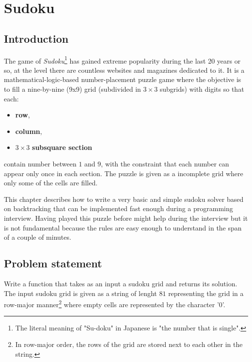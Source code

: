 %

\chapter{Sudoku}
\label{ch:sudoku}
\section*{Introduction}
The game of \textit{Sudoku}\footnote{The literal meaning of "Su-doku" in Japanese is "the number
that is single".} has gained extreme popularity during the last 20 years or so, at the level there
are countless websites and magazines dedicated to it. It is a mathematical-logic-based
number-placement puzzle game where the objective is to fill a nine-by-nine (9x9) grid (subdivided in
$3\times3$ subgrids) with digits so that each:
\begin{itemize}[]
	\item \textbf{row},
	\item \textbf{column},
	\item $3\times3$ \textbf{subsquare section}
\end{itemize}
contain number between $1$ and $9$, with the constraint that each number can appear only once in
each section. The puzzle is given as a incomplete grid where only some of the cells are filled.

This chapter describes how to write a very basic and simple sudoku solver based on backtracking that
can be implemented fast enough during a programming interview. Having played this puzzle before
might help during the interview but it is not fundamental because the rules are easy enough to
understand in the span of a couple of minutes.


\section{Problem statement}
\begin{exercise}
Write a function that takes as an input a sudoku grid and returns its solution. The input sudoku
grid is given as a string of lenght $81$ representing the grid in a row-major manner\footnote{In
row-major order, the rows of the grid are stored next to each other in the string.} where empty
cells are represented by the character '0'.
\end{exercise}


